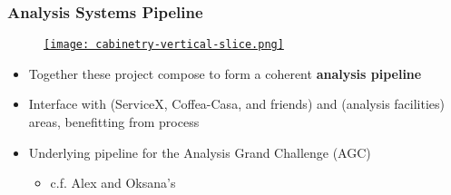 \begin{frame}
  \frametitle{Analysis Systems Pipeline}

  \begin{figure}
    \begin{center}
      \href{https://iris-hep.org/as.html}{\texttt{[image: cabinetry-vertical-slice.png]}}
    \end{center}
  \end{figure}

  \begin{itemize}
    \item Together these project compose to form a coherent \textbf{analysis pipeline}
    \item Interface with  (ServiceX, Coffea-Casa, and friends) and  (analysis facilities) areas, benefitting from  process
    \item Underlying pipeline for the Analysis Grand Challenge (AGC)
    \begin{itemize}
      \item c.f. Alex and Oksana's 
    \end{itemize}
  \end{itemize}

\end{frame}

